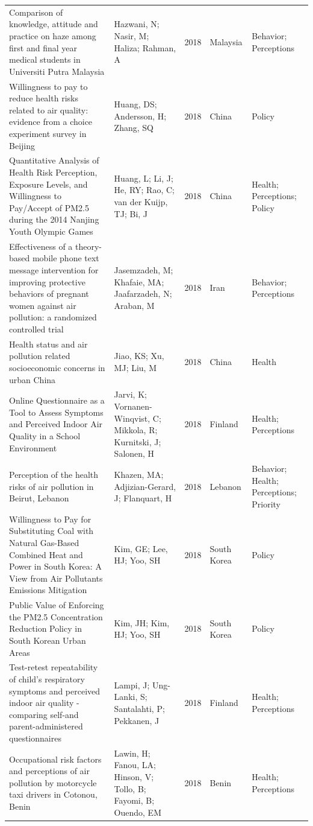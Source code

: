 {\begin{longtable}[t]{p{6cm}p{3cm}lp{3cm}p{3cm}}
Comparison of knowledge, attitude and practice on haze among first and final year medical students in Universiti Putra Malaysia & Hazwani, N; Nasir, M; Haliza; Rahman, A & 2018 & Malaysia & Behavior; Perceptions\\
\addlinespace
Willingness to pay to reduce health risks related to air quality: evidence from a choice experiment survey in Beijing & Huang, DS; Andersson, H; Zhang, SQ & 2018 & China & Policy\\
Quantitative Analysis of Health Risk Perception, Exposure Levels, and Willingness to Pay/Accept of PM2.5 during the 2014 Nanjing Youth Olympic Games & Huang, L; Li, J; He, RY; Rao, C; van der Kuijp, TJ; Bi, J & 2018 & China & Health; Perceptions; Policy\\
Effectiveness of a theory-based mobile phone text message intervention for improving protective behaviors of pregnant women against air pollution: a randomized controlled trial & Jasemzadeh, M; Khafaie, MA; Jaafarzadeh, N; Araban, M & 2018 & Iran & Behavior; Perceptions\\
Health status and air pollution related socioeconomic concerns in urban China & Jiao, KS; Xu, MJ; Liu, M & 2018 & China & Health\\
Online Questionnaire as a Tool to Assess Symptoms and Perceived Indoor Air Quality in a School Environment & Jarvi, K; Vornanen-Winqvist, C; Mikkola, R; Kurnitski, J; Salonen, H & 2018 & Finland & Health; Perceptions\\
\addlinespace
Perception of the health risks of air pollution in Beirut, Lebanon & Khazen, MA; Adjizian-Gerard, J; Flanquart, H & 2018 & Lebanon & Behavior; Health; Perceptions; Priority\\
Willingness to Pay for Substituting Coal with Natural Gas-Based Combined Heat and Power in South Korea: A View from Air Pollutants Emissions Mitigation & Kim, GE; Lee, HJ; Yoo, SH & 2018 & South Korea & Policy\\
Public Value of Enforcing the PM2.5 Concentration Reduction Policy in South Korean Urban Areas & Kim, JH; Kim, HJ; Yoo, SH & 2018 & South Korea & Policy\\
Test-retest repeatability of child's respiratory symptoms and perceived indoor air quality - comparing self-and parent-administered questionnaires & Lampi, J; Ung-Lanki, S; Santalahti, P; Pekkanen, J & 2018 & Finland & Health; Perceptions\\
Occupational risk factors and perceptions of air pollution by motorcycle taxi drivers in Cotonou, Benin & Lawin, H; Fanou, LA; Hinson, V; Tollo, B; Fayomi, B; Ouendo, EM & 2018 & Benin & Health; Perceptions\\

\end{longtable}}
